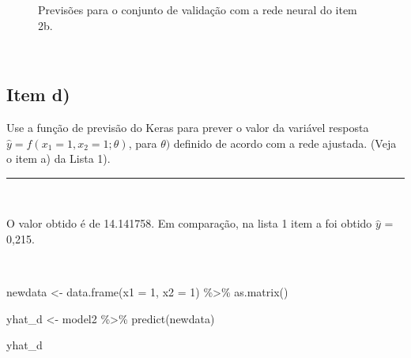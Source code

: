 \documentclass[
  a4paperpaper,
]{article}
\newenvironment{Shaded}{\begin{snugshade}}{\end{snugshade}}
\newcommand{\AttributeTok}[1]{\textcolor[rgb]{0.40,0.45,0.13}{#1}}
\newcommand{\DecValTok}[1]{\textcolor[rgb]{0.68,0.00,0.00}{#1}}
\newcommand{\FunctionTok}[1]{\textcolor[rgb]{0.28,0.35,0.67}{#1}}
\newcommand{\NormalTok}[1]{\textcolor[rgb]{0.00,0.23,0.31}{#1}}
\newcommand{\OtherTok}[1]{\textcolor[rgb]{0.00,0.23,0.31}{#1}}
\newcommand{\SpecialCharTok}[1]{\textcolor[rgb]{0.37,0.37,0.37}{#1}}
\begin{document}
\begin{figure}[H]


\caption{\label{fig-previsoesq2c}Previsões para o conjunto de validação
com a rede neural do item 2b.}

\end{figure}%

~

\subsection{Item d)}\label{item-d-1}

Use a função de previsão do Keras para prever o valor da variável
resposta \(\hat{y} = f(x_1 = 1, x_2 = 1; \theta)\), para \(\theta)\)
definido de acordo com a rede ajustada. (Veja o item a) da Lista 1).

\begin{center}\rule{0.5\linewidth}{0.5pt}\end{center}

~

O valor obtido é de 14.141758. Em comparação, na lista 1 item a foi
obtido \(\hat{y}\) = 0,215.

~

\begin{Shaded}
\begin{Highlighting}[]
\NormalTok{newdata }\OtherTok{\textless{}{-}} \FunctionTok{data.frame}\NormalTok{(}\AttributeTok{x1 =} \DecValTok{1}\NormalTok{, }\AttributeTok{x2 =} \DecValTok{1}\NormalTok{) }\SpecialCharTok{\%\textgreater{}\%} \FunctionTok{as.matrix}\NormalTok{()}

\NormalTok{yhat\_d }\OtherTok{\textless{}{-}}\NormalTok{ model2 }\SpecialCharTok{\%\textgreater{}\%} \FunctionTok{predict}\NormalTok{(newdata)}

\NormalTok{yhat\_d}
\end{Highlighting}
\end{Shaded}
\end{document}

